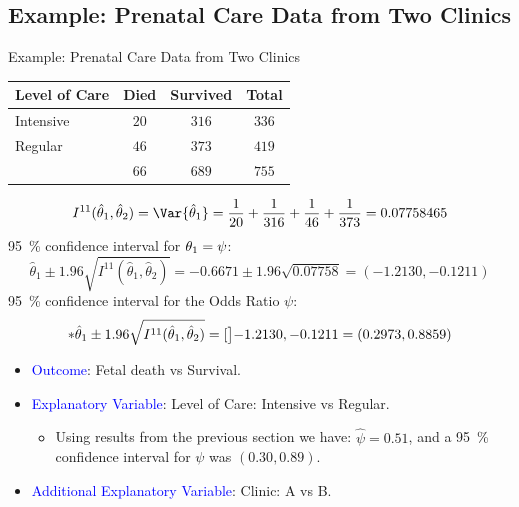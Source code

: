 \documentclass[oneside]{book}\usepackage[]{graphicx}\usepackage[svgnames]{xcolor}
\let\exp\relax%
\let\log\relax%
\begin{document}
\subsection*{Example: Prenatal Care Data from Two Clinics}
\begin{Example}{Example: Prenatal Care Data from Two Clinics}
    \begin{center}
        \begin{NiceTabular}{l|cc|c}
            Level of Care & Died                            & Survived & Total                                        \\
            \midrule
            Intensive & $ 20 $                            & $ 316 $                 & $ 336 $         \\
            Regular   & $ 46 $                            & $ 373 $                 & $ 419 $         \\
            \midrule
            & $ 66 $                    & $ 689 $ & $ 755 $
        \end{NiceTabular}
    \end{center}
\end{Example}
\[ I^{11}(\hat{\theta}_1,\hat{\theta}_2)=\Var{\hat{\theta}_1}=\frac{1}{20} +\frac{1}{316} +\frac{1}{46}+\frac{1}{373}=0.07758465 \]
\qty{95}{\percent} confidence interval for $ \theta_1=\log{\psi} $:
\[ \hat{\theta}_1\pm 1.96\sqrt{I^{11}(\hat{\theta}_1,\hat{\theta}_2)}=-0.6671\pm 1.96\sqrt{0.07758}=(-1.2130,-0.1211) \]
\qty{95}{\percent} confidence interval for the Odds Ratio $ \psi $:
\[ \exp*{\hat{\theta}_1\pm 1.96\sqrt{I^{11}(\hat{\theta}_1,\hat{\theta}_2)}}=\exp[\big]{-1.2130,-0.1211}=(0.2973, 0.8859) \]
\begin{itemize}
    \item \textcolor{Blue}{Outcome}: Fetal death vs Survival.
    \item \textcolor{Blue}{Explanatory Variable}: Level of Care: Intensive vs Regular.
          \begin{itemize}
              \item Using results from the previous section we have: $ \hat{\psi}=0.51 $, and a \qty{95}{\percent} confidence interval for $ \psi $ was $ (0.30,0.89) $.
          \end{itemize}
    \item \textcolor{Blue}{Additional Explanatory Variable}: Clinic: A vs B.
\end{itemize}
\end{document}
